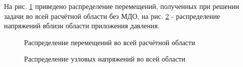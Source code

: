 \documentclass[a4paper]{article}
\begin{document}
\newpage

На рис. \ref{fig:task_02_basic_displacement_distribution} приведено распределение перемещений, полученных при решении задачи во всей расчётной области без МДО, на рис. \ref{fig:task_02_basic_pressure_distribution_y} - распределение напряжений вблизи области приложения давления.

\begin{figure}[h]
\caption{Распределение перемещений во всей расчётной области}
\label{fig:task_02_basic_displacement_distribution}
\end{figure}

\begin{figure}[h]
\caption{Распределение узловых напряжений во всей области}
\label{fig:task_02_basic_pressure_distribution_y}
\end{figure}
\end{document}
